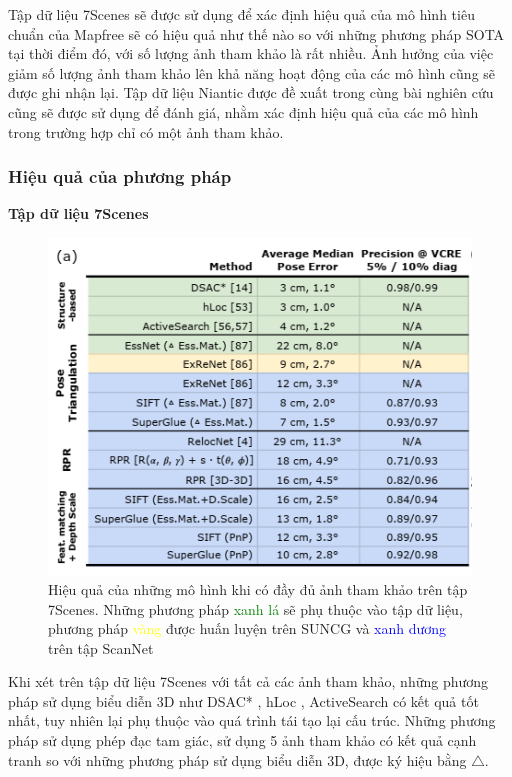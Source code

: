 Tập dữ liệu 7Scenes \cite{6619221} sẽ được sử dụng để xác định hiệu quả của mô hình tiêu chuẩn của Mapfree sẽ có hiệu quả như thế nào so với những phương pháp SOTA tại thời điểm đó, với số lượng ảnh tham khảo là rất nhiều. Ảnh hưởng của việc giảm số lượng ảnh tham khảo lên khả năng hoạt động của các mô hình cũng sẽ được ghi nhận lại. Tập dữ liệu Niantic được đề xuất trong cùng bài nghiên cứu cũng sẽ được sử dụng để đánh giá, nhằm xác định hiệu quả của các mô hình trong trường hợp chỉ có một ảnh tham khảo.

\subsubsection*{Hiệu quả của phương pháp}

\textbf{Tập dữ liệu 7Scenes \cite{6619221}}

\begin{figure}[H]
    \centering
    \includegraphics[scale=0.8]{pics/Proposal/all_7scene.png}
    \caption[Bảng so sánh hiệu quả của các mô hình trên tập 7Scenes]{Hiệu quả của những mô hình khi có đầy đủ ảnh tham khảo trên tập 7Scenes. Những phương pháp \textcolor{green}{xanh lá} sẽ phụ thuộc vào tập dữ liệu, phương pháp \textcolor{yellow}{vàng} được huấn luyện trên SUNCG \cite{song2017semantic} và \textcolor{blue}{xanh dương} trên tập ScanNet \cite{dai2017scannet}}
\end{figure}

Khi xét trên tập dữ liệu 7Scenes với tất cả các ảnh tham khảo, những phương pháp sử dụng biểu diễn 3D như DSAC* \cite{brachmann2021visual}, hLoc \cite{sarlin2019coarse}, ActiveSearch \cite{sattler2016efficient} có kết quả tốt nhất, tuy nhiên lại phụ thuộc vào quá trình tái tạo lại cấu trúc. Những phương pháp sử dụng phép đạc tam giác, sử dụng 5 ảnh tham khảo có kết quả cạnh tranh so với những phương pháp sử dụng biểu diễn 3D, được ký hiệu bằng $\triangle$. 

